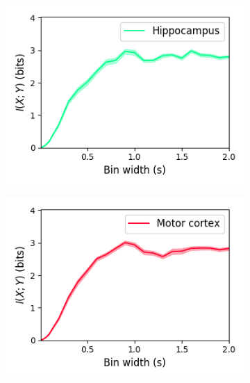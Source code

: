 \documentclass[a4paper,12pt]{article}
\theoremstyle{definition}
\begin{document}
\begin{figure}[p]
  \begin{subfigure}{0.5\textwidth}
    \centering
    \includegraphics[width=\textwidth]{figures/linear_mutual_info_by_bin_width_hippocampus_15.png}
  \end{subfigure}
  \begin{subfigure}{0.5\textwidth}
    \centering
    \includegraphics[width=\textwidth]{figures/linear_mutual_info_by_bin_width_motor_cortex_15.png}
  \end{subfigure}
  \begin{subfigure}{0.5\textwidth}
    \centering

\end{subfigure}
\end{figure}
\end{document}
